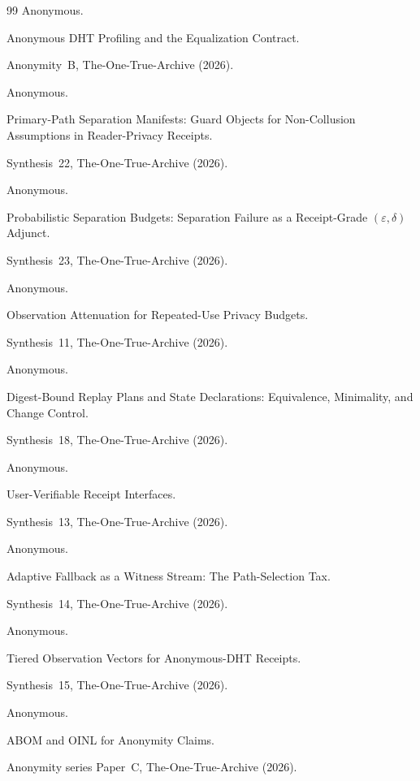 \documentclass[11pt]{article}
\begin{document}
\begin{thebibliography}{99}
Anonymous.

\newblock Anonymous DHT Profiling and the Equalization Contract.

\newblock Anonymity~B, The-One-True-Archive (2026).

Anonymous.

\newblock Primary-Path Separation Manifests: Guard Objects for Non-Collusion Assumptions in Reader-Privacy Receipts.

\newblock Synthesis~22, The-One-True-Archive (2026).

Anonymous.

\newblock Probabilistic Separation Budgets: Separation Failure as a Receipt-Grade $(\varepsilon,\delta)$ Adjunct.

\newblock Synthesis~23, The-One-True-Archive (2026).

Anonymous.

\newblock Observation Attenuation for Repeated-Use Privacy Budgets.

\newblock Synthesis~11, The-One-True-Archive (2026).


Anonymous.

\newblock Digest-Bound Replay Plans and State Declarations: Equivalence, Minimality, and Change Control.

\newblock Synthesis~18, The-One-True-Archive (2026).

Anonymous.

\newblock User-Verifiable Receipt Interfaces.

\newblock Synthesis~13, The-One-True-Archive (2026).

Anonymous.

\newblock Adaptive Fallback as a Witness Stream: The Path-Selection Tax.

\newblock Synthesis~14, The-One-True-Archive (2026).

Anonymous.

\newblock Tiered Observation Vectors for Anonymous-DHT Receipts.

\newblock Synthesis~15, The-One-True-Archive (2026).

Anonymous.

\newblock ABOM and OINL for Anonymity Claims.

\newblock Anonymity series Paper~C, The-One-True-Archive (2026).


\end{thebibliography}
\end{document}
